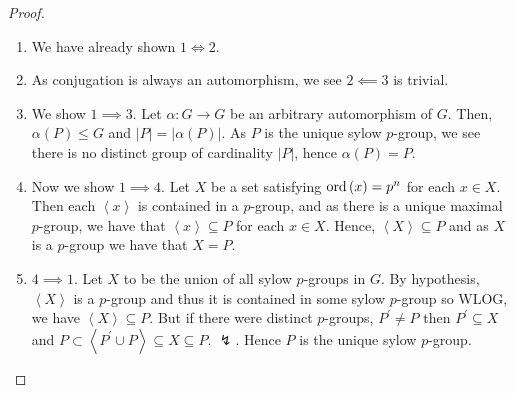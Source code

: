 \begin{proof}
	\begin{enumerate}
		\item We have already shown \(1 \iff 2\).
		\item As conjugation is always an automorphism, we see \(2 \impliedby 3\) is trivial.
		\item We show \(1 \implies 3\). Let \(\alpha: G \to G\) be an arbitrary automorphism of \(G\). Then, \(\alpha\left( P \right) \le G\) and \(\left| P \right|  = \left| \alpha\left( P \right)  \right| \). As \(P\) is the unique sylow \(p\)-group, we see there is no distinct group of cardinality \(\left| P \right| \), hence \(\alpha\left( P \right)  = P\).
		\item Now we show \(1 \implies 4\). Let \(X\) be a set satisfying \(\operatorname{ord} \left( x \right) = p^{n}\) for each \(x \in X\). Then each \(\left<x \right>\) is contained in a \(p\)-group, and as there is a unique maximal \(p\)-group, we have that \(\left<x \right> \subseteq P\) for each \( x\in X\). Hence, \(\left<X \right> \subseteq P\) and as \(X \) is a \(p\)-group we have that \(X = P\).
			\item \(4 \implies 1\). Let \(X\) to be the union of all sylow \(p\)-groups in \(G\). By hypothesis, \(\left<X \right> \) is a \(p\)-group and thus it is contained in some sylow \(p\)-group so WLOG, we have \(\left<X \right> \subseteq P\). But if there were distinct \(p\)-groups, \(P^{\prime} \neq P\) then \(P ^{\prime} \subseteq X\) and \(P \subset \left<P^{\prime} \cup P \right>  \subseteq X \subseteq P\). \(\lightning\). Hence \(P\) is the unique sylow \(p\)-group.
	\end{enumerate}
\end{proof}
